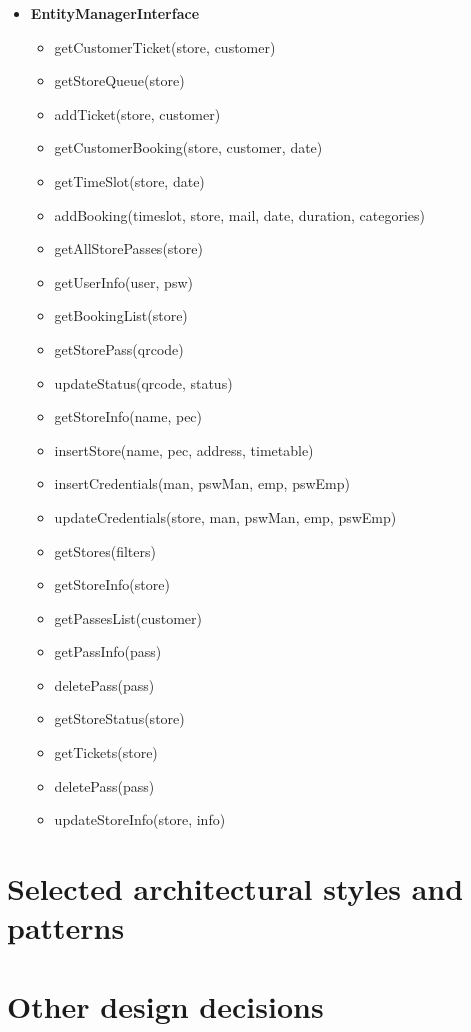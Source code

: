 \begin{itemize}
	\item \textbf{EntityManagerInterface}
	\begin{itemize}
		\item getCustomerTicket(store, customer)
		\item getStoreQueue(store)
		\item addTicket(store, customer)
		\item getCustomerBooking(store, customer, date)
		\item getTimeSlot(store, date)
		\item addBooking(timeslot, store, mail, date, duration, categories)
		\item getAllStorePasses(store)
		\item getUserInfo(user, psw)
		\item getBookingList(store)
		\item getStorePass(qrcode)
		\item updateStatus(qrcode, status)
		\item getStoreInfo(name, pec)
		\item insertStore(name, pec, address, timetable)
		\item insertCredentials(man, pswMan, emp, pswEmp)
		\item updateCredentials(store, man, pswMan, emp, pswEmp)
		\item getStores(filters)
		\item getStoreInfo(store)
		\item getPassesList(customer)
		\item getPassInfo(pass)
		\item deletePass(pass)
		\item getStoreStatus(store)
		\item getTickets(store)
		\item deletePass(pass)
		\item updateStoreInfo(store, info)
	\end{itemize}
\end{itemize}

\clearpage

\section{Selected architectural styles and patterns}

\clearpage

\section{Other design decisions}
